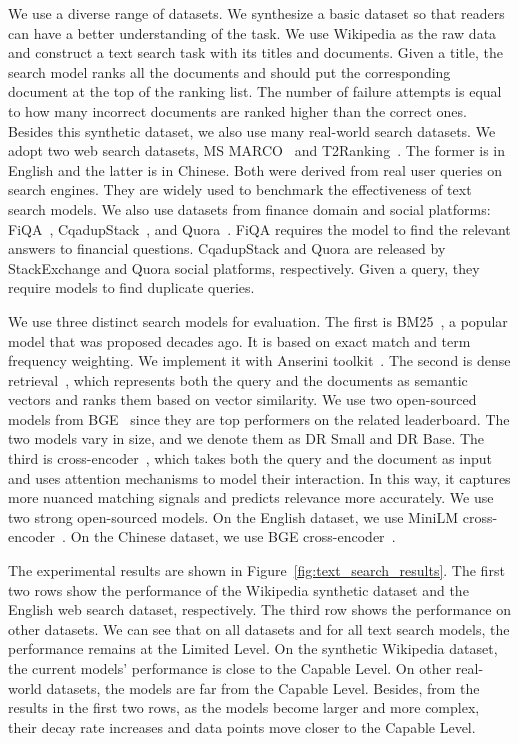 We use a diverse range of datasets. 
We synthesize a basic dataset so that readers can have a better understanding of the task. We use Wikipedia as the raw data and construct a text search task with its titles and documents. Given a title, the search model ranks all the documents and should put the corresponding document at the top of the ranking list. The number of failure attempts is equal to how many incorrect documents are ranked higher than the correct ones. 
Besides this synthetic dataset, we also use many real-world search datasets.
We adopt two web search datasets, MS MARCO~\citep{Bajaj2016Msmarco} and T2Ranking~\citep{xie2023t2ranking}. The former is in English and the latter is in Chinese. Both were derived from real user queries on search engines. They are widely used to benchmark the effectiveness of text search models.
We also use datasets from finance domain and social platforms: FiQA~\citep{Maia2018FiQA}, CqadupStack~\citep{hoogeveen2015}, and Quora~\citep{Iyer2022first}. FiQA requires the model to find the relevant answers to financial questions. CqadupStack and Quora are released by StackExchange and Quora social platforms, respectively. Given a query, they require models to find duplicate queries.

We use three distinct search models for evaluation. The first is BM25~\citep{robertson1976relevance}, a popular model that was proposed decades ago. It is based on exact match and term frequency weighting. We implement it with Anserini toolkit~\citep{yang2017anserini}.
The second is dense retrieval~\citep{karpukhin2020dense, reimers2019sentence}, which represents both the query and the documents as semantic vectors and ranks them based on vector similarity. We use two open-sourced models from BGE~\citep{bge_embedding} since they are top performers on the related leaderboard. The two models vary in size, and we denote them as DR Small and DR Base.
The third is cross-encoder~\citep{nogueira2019passage}, which takes both the query and the document as input and uses attention mechanisms to model their interaction. In this way, it captures more nuanced matching signals and predicts relevance more accurately. We use two strong open-sourced models. On the English dataset, we use MiniLM cross-encoder~\citep{reimers2019sentence}. On the Chinese dataset, we use BGE cross-encoder~\citep{bge_embedding}. 




The experimental results are shown in Figure~\ref{fig:text_search_results}. The first two rows show the performance of the Wikipedia synthetic dataset and the English web search dataset, respectively. The third row shows the performance on other datasets. We can see that on all datasets and for all text search models, the performance remains at the Limited Level. On the synthetic Wikipedia dataset, the current models' performance is close to the Capable Level. On other real-world datasets, the models are far from the Capable Level. Besides, from the results in the first two rows, as the models become larger and more complex, their decay rate increases and data points move closer to the Capable Level.

